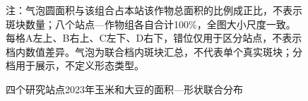 \begin{figure}[!t]
\begin{minipage}{\textwidth}
\centering
\captionsetup{type=figure}

\caption{四个研究站点2023年玉米和大豆的面积—形状联合分布}
\label{fig:sec13_area_shape_joint}
\par\nointerlineskip\vspace{3pt}
{\songti\rmfamily{}\raggedright
注：气泡圆面积与该组合占本站该作物总面积的比例成正比，不表示斑块数量；八个站点—作物组各自合计100\%，全图大小尺度一致。每格A左上、B右上、C左下、D右下，错位仅用于区分站点，不表示档内数值差异。气泡为联合档内斑块汇总，不代表单个真实斑块；分档用于展示，不定义形态类型。\par}
\end{minipage}
\end{figure}
